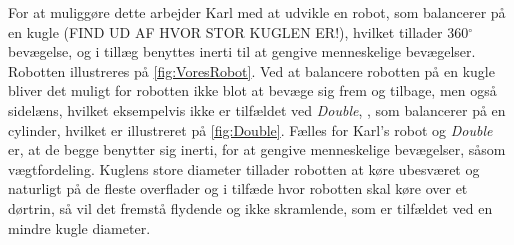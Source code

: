 For at muliggøre dette arbejder Karl med at udvikle en robot, som balancerer på en kugle (FIND UD AF HVOR STOR KUGLEN ER!), hvilket tillader 360$^{\circ}$ bevægelse, og i tillæg benyttes inerti til at gengive menneskelige bevægelser. Robotten illustreres på \autoref{fig:VoresRobot}. Ved at balancere robotten på en kugle bliver det muligt for robotten ikke blot at bevæge sig frem og tilbage, men også sidelæns, hvilket eksempelvis ikke er tilfældet ved \textit{Double}, \parencite{WEB:Double}, som balancerer på en cylinder, hvilket er illustreret på \autoref{fig:Double}. Fælles for Karl's robot og \textit{Double} er, at de begge benytter sig inerti, for at gengive menneskelige bevægelser, såsom vægtfordeling. Kuglens store diameter tillader robotten at køre ubesværet og naturligt på de fleste overflader og i tilfæde hvor robotten skal køre over et dørtrin, så vil det fremstå flydende og ikke skramlende, som er tilfældet ved en mindre kugle diameter. 
%
